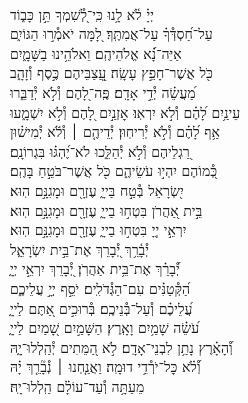\documentclass[twoside, openany, parskip=half, 11pt]{book}
\begin{document}
{\begin{narrow}
\\
יְיָ֗ לֹ֫א לָ֥נוּ \hfill כִּֽי־לְ֭֯שִׁמְךָ תֵּ֣ן כָּב֑וֹד \\ עַל־חַ֝סְדְּ֯ךָ֗ עַל־אֲמִתֶּֽךָ׃ \hfill
לָ֭מָּה יֹאמְ֯ר֣וּ הַגּוֹיִ֑ם\\ אַיֵּה־נָ֗֝א אֱלֹהֵיהֶֽם׃ \hfill
וֵאלֹהֵ֥ינוּ בַשָּׁמָ֑יִם\\ כֹּ֖ל אֲשֶׁר־חָפֵ֣ץ עָשָֽׂה׃ \hfill
עֲֽ֭צַבֵּיהֶם כֶּ֣סֶף וְ֯זָהָ֑ב\\ מַ֝עֲשֵׂ֗ה יְ֯דֵ֣י אָדָֽם׃ \hfill
פֶּֽה־לָ֭הֶם וְ֯לֹ֣א יְ֯דַבֵּ֑רוּ\\ עֵינַ֥יִם לָ֝הֶ֗ם וְ֯לֹ֣א יִרְאֽוּ׃ \hfill
אׇזְנַ֣יִם לָ֭הֶם וְ֯לֹ֣א יִשְׁמָ֑עוּ\\ אַ֥ף לָ֝הֶ֗ם וְ֯לֹ֣א יְ֯רִיחֽוּן׃ \hfill
יְ֯דֵיהֶ֤ם ׀ וְ֯לֹ֬א יְ֯מִישׁ֗וּן\\ רַ֭גְלֵיהֶם וְ֯לֹ֣א יְ֯הַלֵּ֑כוּ \hfill לֹא־יֶ֝הְגּ֗וּ בִּגְרוֹנָֽם׃ \\
כְּ֭֯מוֹהֶם יִהְי֣וּ עֹשֵׂיהֶ֑ם \hfill כֹּ֖ל אֲשֶׁר־בֹּטֵ֣חַ בָּהֶֽם׃ \\
יִ֭שְׂרָאֵל בְּ֯טַ֣ח בַּייָ֑ \hfill עֶזְרָ֖ם וּמָגִנָּ֣ם הֽוּא׃ \\
בֵּ֣ית אַ֭הֲרֹן בִּטְח֣וּ בַייָ֑ \hfill עֶזְרָ֖ם וּמָגִנָּ֣ם הֽוּא׃ \\
יִרְאֵ֣י יְיָ֭ בִּטְח֣וּ בַייָ֑ \hfill עֶזְרָ֖ם וּמָגִנָּ֣ם הֽוּא׃ \\

יְ֯בָ֫רֵ֥ךְ יְ֭֯בָרֵךְ \hfill אֶת־בֵּ֣ית יִשְׂרָאֵ֑ל\\ יְ֯֝בָרֵ֗ךְ אֶת־בֵּ֥ית אַהֲרֹֽן׃ \hfill
יְ֭֯בָרֵךְ יִרְאֵ֣י יְיָ֑\\ הַ֝קְּ֯טַנִּ֗ים עִם־הַגְּ֯דֹלִֽים׃ \hfill
יֹסֵ֣ף יְיָ֣ עֲלֵיכֶ֑ם\\ עֲ֝לֵיכֶ֗ם וְ֯עַל־בְּ֯נֵיכֶֽם׃ \hfill
בְּ֯רוּכִ֣ים אַ֭תֶּם לַייָ֑\\ עֹ֝שֵׂ֗ה שָׁמַ֥יִם וָאָֽרֶץ׃ \hfill
הַשָּׁמַ֣יִם שָׁ֭מַיִם לַייָ֑\\ וְ֯֝הָאָ֗רֶץ נָתַ֥ן לִבְנֵי־אָדָֽם׃ \hfill
לֹ֣א הַ֭מֵּתִים יְ֯הַֽלְלוּ־יָ֑הּ\\ וְ֯֝לֹ֗א כׇּל־יֹרְ֯דֵ֥י דוּמָֽה׃ \hfill
וַאֲנַ֤חְנוּ ׀ נְ֯בָ֘רֵ֤ךְ יָ֗הּ\\ מֵעַתָּ֥ה וְ֯עַד־עוֹלָ֗ם הַֽלְלוּ־יָֽהּ׃ \hfill \break



\end{narrow}}
\end{document}
